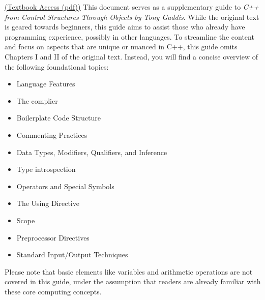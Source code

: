 \documentclass{report}
\begin{document}
    \bigbreak \noindent 
    \href{https://github.com/JiaRuiShao/CPP/blob/master/Starting%20Out%20with%20C%2B%2B%20from%20Control%20Structures%20to%20Objects%208%20Tony%20Gaddis.pdf}{(Textbook Access (pdf))}
    \bigbreak \noindent 
    This document serves as a supplementary guide to \textit{C++ from Control Structures Through Objects by Tony Gaddis}. While the original text is geared towards beginners, this guide aims to assist those who already have programming experience, possibly in other languages.
    \bigbreak \noindent 
    To streamline the content and focus on aspects that are unique or nuanced in C++, this guide omits Chapters I and II of the original text. Instead, you will find a concise overview of the following foundational topics:
    \begin{itemize}
        \item Language Features
        \item The complier
        \item Boilerplate Code Structure
        \item Commenting Practices
        \item Data Types, Modifiers, Qualifiers, and Inference
        \item Type introspection
        \item Operators and Special Symbols
        \item The Using Directive
        \item Scope 
        \item Preprocessor Directives
        \item Standard Input/Output Techniques
    \end{itemize}
    \bigbreak \noindent
    Please note that basic elements like variables and arithmetic operations are not covered in this guide, under the assumption that readers are already familiar with these core computing concepts.

    
\end{document}
